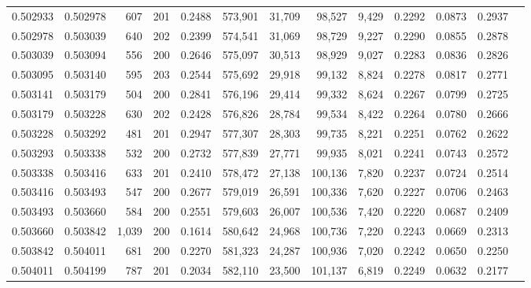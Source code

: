 \begin{tabular}{rrrrrrrrrrrrr}
0.502933 & 0.502978 &   607 & 201 &                                     0.2488 & 573,901 &  31,709 &  98,527 &   9,429 & 0.2292 & 0.0873 & 0.2937 \\
0.502978 & 0.503039 &   640 & 202 &                                     0.2399 & 574,541 &  31,069 &  98,729 &   9,227 & 0.2290 & 0.0855 & 0.2878 \\
0.503039 & 0.503094 &   556 & 200 &                                     0.2646 & 575,097 &  30,513 &  98,929 &   9,027 & 0.2283 & 0.0836 & 0.2826 \\
0.503095 & 0.503140 &   595 & 203 &                                     0.2544 & 575,692 &  29,918 &  99,132 &   8,824 & 0.2278 & 0.0817 & 0.2771 \\
0.503141 & 0.503179 &   504 & 200 &                                     0.2841 & 576,196 &  29,414 &  99,332 &   8,624 & 0.2267 & 0.0799 & 0.2725 \\
0.503179 & 0.503228 &   630 & 202 &                                     0.2428 & 576,826 &  28,784 &  99,534 &   8,422 & 0.2264 & 0.0780 & 0.2666 \\
0.503228 & 0.503292 &   481 & 201 &                                     0.2947 & 577,307 &  28,303 &  99,735 &   8,221 & 0.2251 & 0.0762 & 0.2622 \\
0.503293 & 0.503338 &   532 & 200 &                                     0.2732 & 577,839 &  27,771 &  99,935 &   8,021 & 0.2241 & 0.0743 & 0.2572 \\
0.503338 & 0.503416 &   633 & 201 &                                     0.2410 & 578,472 &  27,138 & 100,136 &   7,820 & 0.2237 & 0.0724 & 0.2514 \\
0.503416 & 0.503493 &   547 & 200 &                                     0.2677 & 579,019 &  26,591 & 100,336 &   7,620 & 0.2227 & 0.0706 & 0.2463 \\
0.503493 & 0.503660 &   584 & 200 &                                     0.2551 & 579,603 &  26,007 & 100,536 &   7,420 & 0.2220 & 0.0687 & 0.2409 \\
0.503660 & 0.503842 & 1,039 & 200 &                                     0.1614 & 580,642 &  24,968 & 100,736 &   7,220 & 0.2243 & 0.0669 & 0.2313 \\
0.503842 & 0.504011 &   681 & 200 &                                     0.2270 & 581,323 &  24,287 & 100,936 &   7,020 & 0.2242 & 0.0650 & 0.2250 \\
0.504011 & 0.504199 &   787 & 201 &                                     0.2034 & 582,110 &  23,500 & 101,137 &   6,819 & 0.2249 & 0.0632 & 0.2177 \\

\end{tabular}
